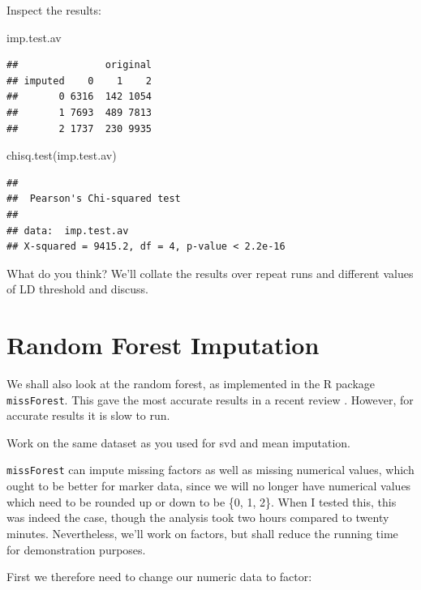 \documentclass[
]{book}
\newenvironment{Shaded}{\begin{snugshade}}{\end{snugshade}}
\newcommand{\FunctionTok}[1]{\textcolor[rgb]{0.00,0.00,0.00}{#1}}
\newcommand{\NormalTok}[1]{#1}
\begin{document}
Inspect the results:

\begin{Shaded}
\begin{Highlighting}[]
\NormalTok{imp.test.av}
\end{Highlighting}
\end{Shaded}

\begin{verbatim}
##               original
## imputed    0    1    2
##       0 6316  142 1054
##       1 7693  489 7813
##       2 1737  230 9935
\end{verbatim}

\begin{Shaded}
\begin{Highlighting}[]
\FunctionTok{chisq.test}\NormalTok{(imp.test.av)}
\end{Highlighting}
\end{Shaded}

\begin{verbatim}
## 
##  Pearson's Chi-squared test
## 
## data:  imp.test.av
## X-squared = 9415.2, df = 4, p-value < 2.2e-16
\end{verbatim}

What do you think? We'll collate the results over repeat runs and different values of LD threshold and discuss.

\hypertarget{random-forest-imputation}{%
\section{Random Forest Imputation}\label{random-forest-imputation}}

We shall also look at the random forest, as implemented in the R package \texttt{missForest}. This gave the most accurate results in a recent review \citet{Rutkoski_2013}. However, for accurate results it is slow to run.

Work on the same dataset as you used for svd and mean imputation.

\texttt{missForest} can impute missing factors as well as missing numerical values, which ought to be better for marker data, since we will no longer have numerical values which need to be rounded up or down to be \{0, 1, 2\}. When I tested this, this was indeed the case, though the analysis took two hours compared to twenty minutes. Nevertheless, we'll work on factors, but shall reduce the running time for demonstration purposes.

First we therefore need to change our numeric data to factor:
\end{document}
